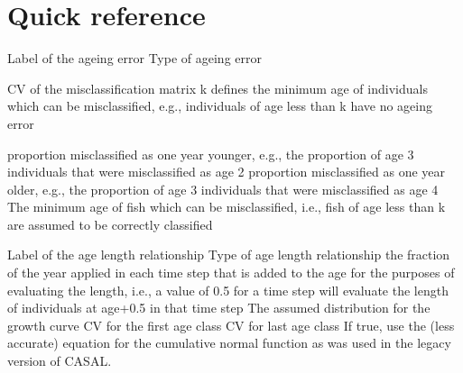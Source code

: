 \section{Quick reference\label{sec:quick-reference}}
\par
{} {Label of the ageing error}
 {Type of ageing error}
\par\textbf{}\par
\par\textbf{}\par
\par\textbf{}\par
{} {CV of the misclassification matrix}
 {k defines the minimum age of individuals which can be misclassified, e.g., individuals of age less than k have no ageing error}
\par\textbf{}\par
{} {proportion misclassified as one year younger, e.g., the proportion of age 3 individuals that were misclassified as age 2}
 {proportion misclassified as one year older, e.g., the proportion of age 3 individuals that were misclassified as age 4}
 {The minimum age of fish which can be misclassified, i.e., fish of age less than k are assumed to be correctly classified}
\par\par
{} {Label of the age length relationship}
 {Type of age length relationship}
 {the fraction of the year applied in each time step that is added to the age for the purposes of evaluating the length, i.e., a value of 0.5 for a time step will evaluate the length of individuals at age+0.5 in that time step}
 {The assumed distribution for the growth curve}
 {CV for the first age class}
 {CV for last age class}
 {If true, use the (less accurate) equation for the cumulative normal function as was used in the legacy version of CASAL.}
\par\textbf{}\par
{} {}
 {}
